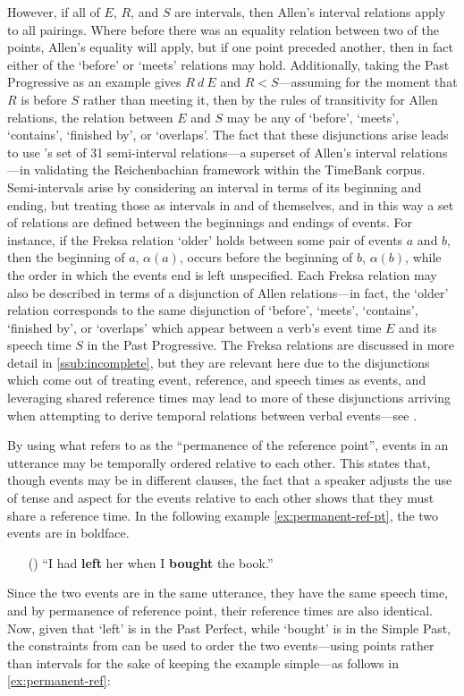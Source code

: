 \documentclass[a4paper,12pt,leqno,twoside]{article}
\newcommand{\ipp}{(\refstepcounter{equation}\theequation)}
\begin{document}
However, if all of $E$, $R$, and $S$ are intervals, then Allen's interval relations apply to all pairings. Where before there was an equality relation between two of the points, Allen's equality will apply, but if one point preceded another, then in fact either of the `before' or `meets' relations may hold. Additionally, taking the Past Progressive as an example gives $R ~d~ E$ and $R < S$---assuming for the moment that $R$ is before $S$ rather than meeting it, then by the rules of transitivity for Allen relations, the relation between $E$ and $S$ may be any of `before', `meets', `contains', `finished by', or `overlaps'. The fact that these disjunctions arise leads \citet{Derczynski2013} to use \citet{Freksa1992}'s set of 31 semi-interval relations---a superset of Allen's interval relations---in validating the Reichenbachian framework within the TimeBank \citep{pustejovsky2006timebank} corpus. Semi-intervals arise by considering an interval in terms of its beginning and ending, but treating those as intervals in and of themselves, and in this way a set of relations are defined between the beginnings and endings of events. For instance, if the Freksa relation `older' holds between some pair of events $a$ and $b$, then the beginning of $a$, $\alpha(a)$, occurs before the beginning of $b$, $\alpha(b)$, while the order in which the events end is left unspecified. Each Freksa relation may also be described in terms of a disjunction of Allen relations---in fact, the `older' relation corresponds to the same disjunction of `before', `meets', `contains', `finished by', or `overlaps' which appear between a verb's event time $E$ and its speech time $S$ in the Past Progressive. The Freksa relations are discussed in more detail in \cref{ssub:incomplete}, but they are relevant here due to the disjunctions which come out of treating event, reference, and speech times as events, and leveraging shared reference times may lead to more of these disjunctions arriving when attempting to derive temporal relations between verbal events---see .

By using what \citet[p. 74]{reichenbach1947elements} refers to as the ``permanence of the reference point'', events in an utterance may be temporally ordered relative to each other. This states that, though events may be in different clauses, the fact that a speaker adjusts the use of tense and aspect for the events relative to each other shows that they must share a reference time. In the following example \cref{ex:permanent-ref-pt}, the two events are in boldface.
\begin{itemize}
	\item[\ipp\label{ex:permanent-ref-pt}] ``I had \textbf{left} her when I \textbf{bought} the book.''
\end{itemize}
Since the two events are in the same utterance, they have the same speech time, and by permanence of reference point, their reference times are also identical. Now, given that `left' is in the Past Perfect, while `bought' is in the Simple Past, the constraints from  can be used to order the two events---using points rather than intervals for the sake of keeping the example simple---as follows in \cref{ex:permanent-ref}:
\end{document}
